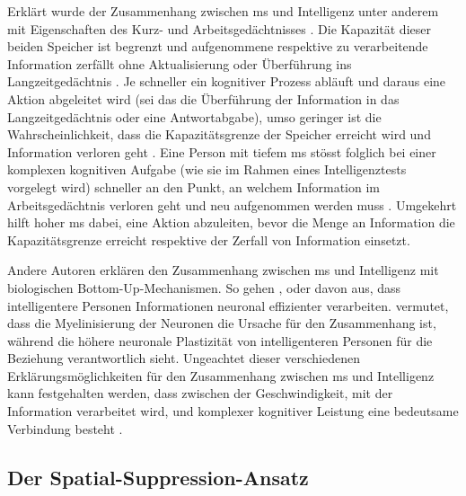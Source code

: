 \documentclass[11pt, twoside, a4paper]{book}		%
\begin{document}
Erklärt wurde der Zusammenhang zwischen \gls{ms} und Intelligenz unter anderem mit Eigenschaften des Kurz- und Arbeitsgedächtnisses \citep[z.~B.][]{Jensen1982b, Jensen2006, Vernon1983}. 
Die Kapazität dieser beiden Speicher ist begrenzt und aufgenommene respektive zu verarbeitende Information zerfällt ohne Aktualisierung oder Überführung ins Langzeitgedächtnis \citep{Baddeley2009}. Je schneller ein kognitiver Prozess abläuft und daraus eine Aktion abgeleitet wird (sei das die Überführung der Information in das Langzeitgedächtnis oder eine Antwortabgabe), umso geringer ist die Wahrscheinlichkeit, dass die Kapazitätsgrenze der Speicher erreicht wird und Information verloren geht \citep{Jensen2006}.
Eine Person mit tiefem \gls{ms} stösst folglich bei einer komplexen kognitiven Aufgabe (wie sie im Rahmen eines Intelligenztests vorgelegt wird) schneller an den Punkt, an welchem Information im Arbeitsgedächtnis verloren geht und neu aufgenommen werden muss \citep{Lehrl1988, Lehrl1990}. Umgekehrt hilft hoher \gls{ms} dabei, eine Aktion abzuleiten, bevor die Menge an Information die Kapazitätsgrenze erreicht respektive der Zerfall von Information einsetzt.

Andere Autoren erklären den Zusammenhang zwischen \gls{ms} und Intelligenz mit biologischen Bot\-tom-Up-Mech\-an\-is\-men. So gehen \citet{Bates1995}, \citet{Hendrickson1980} oder \citet{Reed1992} davon aus, dass intelligentere Personen Informationen neuronal effizienter verarbeiten. \citet{Miller1994} vermutet, dass die Myelinisierung der Neuronen die Ursache für den Zusammenhang ist, während \citet{Garlick2002} die höhere neuronale Plastizität von intelligenteren Personen für die Beziehung verantwortlich sieht. Ungeachtet dieser verschiedenen Erklärungsmöglichkeiten für den Zusammenhang zwischen \gls{ms} und Intelligenz kann festgehalten werden, dass zwischen der Geschwindigkeit, mit der Information verarbeitet wird, und komplexer kognitiver Leistung eine bedeutsame Verbindung besteht  \citep[sowohl auf manifester als auch auf latenter Ebene, siehe][]{Neubauer1996, Sheppard2008}.



\subsection{Der Spatial-Suppression-Ansatz \label{subsec:Der_Spatial-Suppression-Ansatz}}
\end{document}
